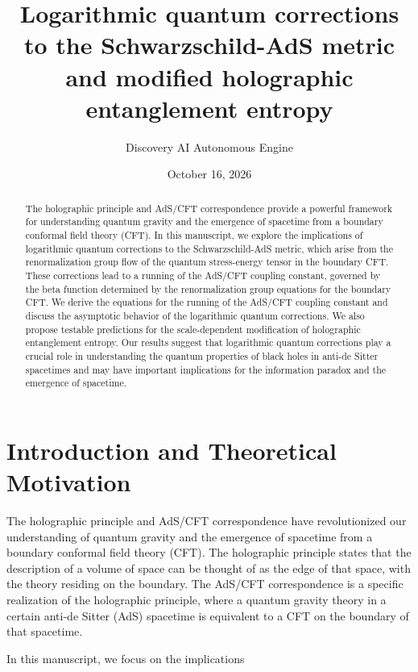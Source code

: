 \documentclass[11pt,a4paper]{article}
\title{Logarithmic quantum corrections to the Schwarzschild-AdS metric and modified holographic entanglement entropy}
\author{Discovery AI Autonomous Engine}
\date{October 16, 2026}
\begin{document}
\maketitle

\begin{abstract}
The holographic principle and AdS/CFT correspondence provide a powerful framework for understanding quantum gravity and the emergence of spacetime from a boundary conformal field theory (CFT). In this manuscript, we explore the implications of logarithmic quantum corrections to the Schwarzschild-AdS metric, which arise from the renormalization group flow of the quantum stress-energy tensor in the boundary CFT. These corrections lead to a running of the AdS/CFT coupling constant, governed by the beta function determined by the renormalization group equations for the boundary CFT. We derive the equations for the running of the AdS/CFT coupling constant and discuss the asymptotic behavior of the logarithmic quantum corrections. We also propose testable predictions for the scale-dependent modification of holographic entanglement entropy. Our results suggest that logarithmic quantum corrections play a crucial role in understanding the quantum properties of black holes in anti-de Sitter spacetimes and may have important implications for the information paradox and the emergence of spacetime.
\end{abstract}

\section{Introduction and Theoretical Motivation}
The holographic principle and AdS/CFT correspondence have revolutionized our understanding of quantum gravity and the emergence of spacetime from a boundary conformal field theory (CFT). The holographic principle states that the description of a volume of space can be thought of as the edge of that space, with the theory residing on the boundary. The AdS/CFT correspondence is a specific realization of the holographic principle, where a quantum gravity theory in a certain anti-de Sitter (AdS) spacetime is equivalent to a CFT on the boundary of that spacetime.

In this manuscript, we focus on the implications
\end{document}
